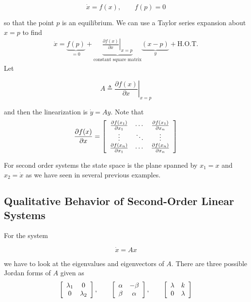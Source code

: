 \begin{equation*}
\dot{x} = f(x), \qquad f(p) = 0
\end{equation*}

so that the point $p$ is an equilibrium.
We can use a Taylor series expansion about $x=p$ to find
\begin{align*}
\dot{x} = \underbrace{f(p)}_{=0} + \underbrace{\left.\frac{\partial f(x)}{\partial x}\right|_{x=p}}_{\text{constant square matrix}} \underbrace{(x-p)}_{y} + \text{H.O.T.}
\end{align*}
Let

\begin{equation*}
A \triangleq \left.\frac{\partial f(x)}{\partial x}\right|_{x=p}
\end{equation*}

and then the linearization is $\dot{y}=Ay$. Note that
\begin{align*}
\frac{\partial f(x)}{\partial x} = \left[\begin{array}{c c c} \frac{\partial f(x_1)}{\partial x_1} & \cdots & \frac{\partial f(x_1)}{\partial x_n} \\ \vdots & \ddots & \vdots \\ \frac{\partial f(x_n)}{\partial x_1} & \cdots & \frac{\partial f(x_n)}{\partial x_n} \end{array}\right]
\end{align*}

For second order systems the state space is the plane spanned by $x_1 = x$ and $x_2 = \dot{x}$ as we have seen in several previous examples.

\subsection{Qualitative Behavior of Second-Order Linear Systems}
For the system

\begin{equation*}
\dot{x} = Ax
\end{equation*}

we have to look at the eigenvalues and eigenvectors of $A$.
There are three possible Jordan forms of $A$ given as
\begin{align*}
\left[\begin{array}{c c} \lambda_1 & 0 \\ 0 & \lambda_2 \end{array}\right], \qquad
\left[\begin{array}{c c} \alpha & -\beta \\ \beta & \alpha \end{array}\right], \qquad
\left[\begin{array}{c c} \lambda & k \\ 0 & \lambda \end{array}\right]
\end{align*}

